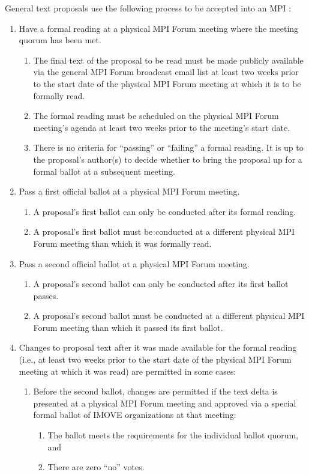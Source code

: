 General text proposals use the following process to be accepted into
an MPI {\color{red}{Standard Document}}:

\begin{enumerate}
\item Have a formal reading at a physical MPI Forum meeting where the
  meeting quorum has been met.
  \begin{enumerate}
  \item The final text of the proposal to be read must be made
    publicly available via the general MPI Forum broadcast email list
    at least two weeks prior to the start date of the physical MPI
    Forum meeting at which it is to be formally read.
  \item The formal reading must be scheduled on the physical MPI Forum
    meeting's agenda at least two weeks prior to the meeting's start
    date.
  \item There is no criteria for ``passing'' or ``failing'' a formal
    reading.  It is up to the proposal's author(s) to decide whether
    to bring the proposal up for a formal ballot at a subsequent
    meeting.
  \end{enumerate}

\item Pass a first official ballot at a physical MPI Forum meeting.
  \begin{enumerate}
  \item A proposal's first ballot can only be conducted after its
    formal reading.
  \item A proposal's first ballot must be conducted at a different
    physical MPI Forum meeting than which it was formally read.
  \end{enumerate}

\item Pass a second official ballot at a physical MPI Forum meeting.
  \begin{enumerate}
  \item A proposal's second ballot can only be conducted after its
    first ballot passes.
  \item A proposal's second ballot must be conducted at a different
    physical MPI Forum meeting than which it passed its first ballot.
  \end{enumerate}

\item Changes to proposal text after it was made available for the
  formal reading (i.e., at least two weeks prior to the start date of
  the physical MPI Forum meeting at which it was read) are permitted
  in some cases:
  \begin{enumerate}
  \item Before the second ballot, changes are permitted if the text
    delta is presented at a physical MPI Forum meeting and approved
    via a special formal ballot of IMOVE organizations at that
    meeting:
    \begin{enumerate}
    \item The ballot meets the requirements for the individual
      ballot quorum, and
    \item There are zero ``no'' votes.
    \end{enumerate}


\end{enumerate}
\end{enumerate}
